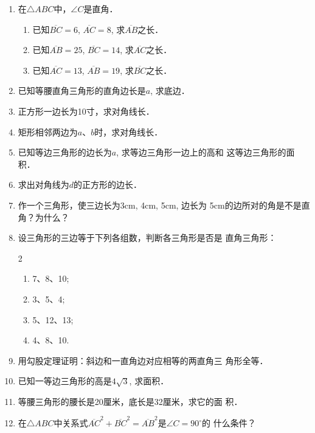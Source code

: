 \begin{ex}
\begin{enumerate}
    \item 在$\triangle ABC$中，$\angle C$是直角．
    \begin{enumerate}
        \item 已知$\overline{BC}=6$, $\overline{AC}=8$, 求$\overline{AB}$之长．
        \item 已知$\overline{AB}=25$, $\overline{BC}=14$, 求$\overline{AC}$之长．
        \item 已知$\overline{AC}=13$, $\overline{AB}=19$, 求$\overline{BC}$之长．
    \end{enumerate}
    
    
    \item 已知等腰直角三角形的直角边长是$a$, 求底边．
    \item 正方形一边长为10寸，求对角线长．
    \item 矩形相邻两边为$a$、$b$时，求对角线长．
    \item 已知等边三角形的边长为$a$, 求等边三角形一边上的高和
    这等边三角形的面积．
    \item 求出对角线为$d$的正方形的边长．
    \item 作一个三角形，使三边长为3cm, 4cm, 5cm, 边长为
    5cm的边所对的角是不是直角？为什么？
    \item 设三角形的三边等于下列各组数，判断各三角形是否是
    直角三角形：
\begin{multicols}{2}
    \begin{enumerate}
        \item 7、8、10;
        \item 3、5、4;
        \item 5、12、13;
        \item 4、8、10.
    \end{enumerate}
\end{multicols}
    \item 用勾股定理证明：斜边和一直角边对应相等的两直角三
    角形全等．
    \item 已知一等边三角形的高是$4\sqrt{3}$, 求面积．
    \item 等腰三角形的腰长是20厘米，底长是32厘米，求它的面
    积．
    \item 在$\triangle ABC$中关系式$\overline{AC}^2+\overline{BC}^2=\overline{AB}^2$是$\angle C=90^{\circ}$的
    什么条件？
\end{enumerate}
\end{ex}

